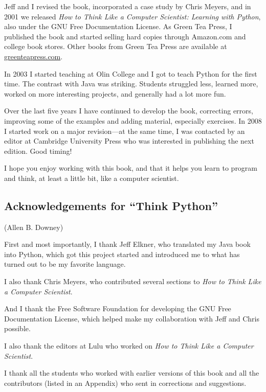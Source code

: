 \documentclass[11pt]{book}
\begin{document}
Jeff and I revised the book, incorporated a case study by
Chris Meyers, and in 2001 we released \emph{How to Think Like
a Computer Scientist: Learning with Python}, also under
the GNU Free Documentation License.
As Green Tea Press, I published the book and started selling
hard copies through Amazon.com and college book stores.
Other books from Green Tea Press are available at
\url{greenteapress.com}.

In 2003 I started teaching at Olin College and I got to teach
Python for the first time.  The contrast with Java was striking.
Students struggled less, learned more, worked on more interesting
projects, and generally had a lot more fun.

Over the last five years I have continued to develop the book,
correcting errors, improving some of the examples and
adding material, especially exercises.  In 2008 I started work
on a major revision---at the same time, I was
contacted by an editor at Cambridge University Press who
was interested in publishing the next edition.  Good timing!

I hope you enjoy working with this book, and that it helps
you learn to program and think, at least a little bit, like
a computer scientist.

\subsection*{Acknowledgements for ``Think Python''}

(Allen B. Downey)

First and most importantly, I thank Jeff Elkner, who
translated my Java book into Python, which got this project
started and introduced me to what has turned out to be my
favorite language.

I also thank Chris Meyers, who contributed several sections
to \emph{How to Think Like a Computer Scientist}.

And I thank the Free Software Foundation for developing
the GNU Free Documentation License, which helped make
my collaboration with Jeff and Chris possible.


I also thank the editors at Lulu who worked on
\emph{How to Think Like a Computer Scientist}.

I thank all the students who worked with earlier
versions of this book and all the contributors (listed
in an Appendix) who sent in corrections and suggestions.
\end{document}
